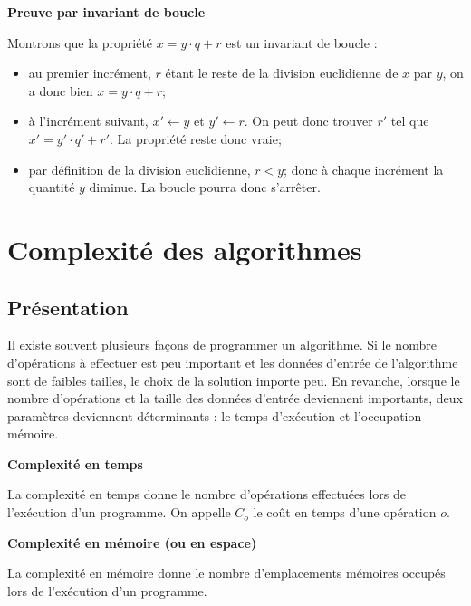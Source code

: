 \documentclass[11pt,oneside]{article}
\begin{document}
\begin{demo}
\textbf{Preuve par invariant de boucle}

Montrons que la propriété  $x=y\cdot q+r$ est un invariant de boucle :
\begin{itemize}
\item au premier incrément, $r$ étant le reste de la division euclidienne de $x$ par $y$, on a donc bien  $x=y\cdot q+r$;
\item à l'incrément suivant, $x'\gets y$ et $y' \gets r$. On peut donc trouver $r'$ tel que $x'=y'\cdot q'+r'$. La propriété reste donc vraie;
\item par définition de la division euclidienne, $r<y$; donc à chaque incrément la quantité $y$ diminue. La boucle pourra donc s'arrêter.
\end{itemize}
\end{demo}

%
%


\section{Complexité des algorithmes}

\subsection{Présentation}
Il existe souvent plusieurs façons de programmer un algorithme. Si le nombre d'opérations à effectuer est peu important et les données d'entrée de l'algorithme sont de faibles tailles, le choix de la solution importe peu. En revanche, lorsque le nombre d'opérations et la taille des données d'entrée deviennent importants, deux paramètres deviennent déterminants : le temps d'exécution et l'occupation mémoire. 


\begin{defi}
\textbf{Complexité en temps}

La complexité en temps donne le nombre d'opérations effectuées lors de l'exécution d'un programme. On appelle $C_o$ le coût en temps d'une opération $o$.

\textbf{Complexité en mémoire (ou en espace)}

La complexité en mémoire donne le nombre d'emplacements mémoires occupés lors de l'exécution d'un programme.


\end{defi}
\end{document}
